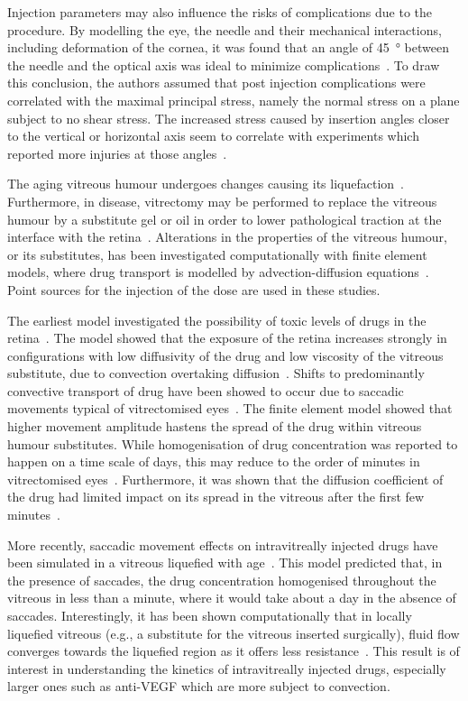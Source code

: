\documentclass{article}
\begin{document}
Injection parameters may also influence the risks of complications due to the procedure.
By modelling the eye, the needle and their mechanical interactions, including deformation of the cornea, it was found that an angle of \SI{45}{\degree} between the needle and the optical axis was ideal to minimize complications~\cite{Karimi_2018}.
To draw this conclusion, the authors assumed that post injection complications were correlated with the maximal principal stress, namely the normal stress on a plane subject to no shear stress.  
The increased stress caused by insertion angles closer to the vertical or horizontal axis seem to correlate with experiments which reported more injuries at those angles~\cite{Karimi_2018}.

The aging vitreous humour undergoes changes causing its liquefaction~\cite{Los_2003}.
Furthermore, in disease, vitrectomy may be performed to replace the vitreous humour by a substitute gel or oil in order to lower pathological traction at the interface with the retina~\cite{Dervenis_2022}.
Alterations in the properties of the vitreous humour, or its substitutes, has been investigated computationally with finite element models, where drug transport is modelled by advection-diffusion equations~\cite{Kathawate_2008,Modareszadeh_2012}.
Point sources for the injection of the dose are used in these studies.

The earliest model investigated the possibility of toxic levels of drugs in the retina~\cite{Kathawate_2008}.
The model showed that the exposure of the retina increases strongly in configurations with low diffusivity of the drug and low viscosity of the vitreous substitute, due to convection overtaking diffusion~\cite{Kathawate_2008}.
Shifts to predominantly convective transport of drug have been showed to occur due to saccadic movements typical of vitrectomised eyes~\cite{Modareszadeh_2012}.
The finite element model showed that higher movement amplitude hastens the spread of the drug within vitreous humour substitutes.
While homogenisation of drug concentration was reported to happen on a time scale of days, this may reduce to the order of minutes in vitrectomised eyes~\cite{Modareszadeh_2012}.
Furthermore, it was shown that the diffusion coefficient of the drug had limited impact on its spread in the vitreous after the first few minutes~\cite{Modareszadeh_2012}.

More recently, saccadic movement effects on intravitreally injected drugs have been simulated in a vitreous liquefied with age~\cite{Ferroni_2020}.
This model predicted that, in the presence of saccades, the drug concentration homogenised throughout the vitreous in less than a minute, where it would take about a day in the absence of saccades.
Interestingly, it has been shown computationally that in locally liquefied vitreous (e.g., a substitute for the vitreous inserted surgically), fluid flow converges towards the liquefied region as it offers less resistance~\cite{Khoobyar_2022}.
This result is of interest in understanding the kinetics of intravitreally injected drugs, especially larger ones such as anti-VEGF which are more subject to convection.
\end{document}
